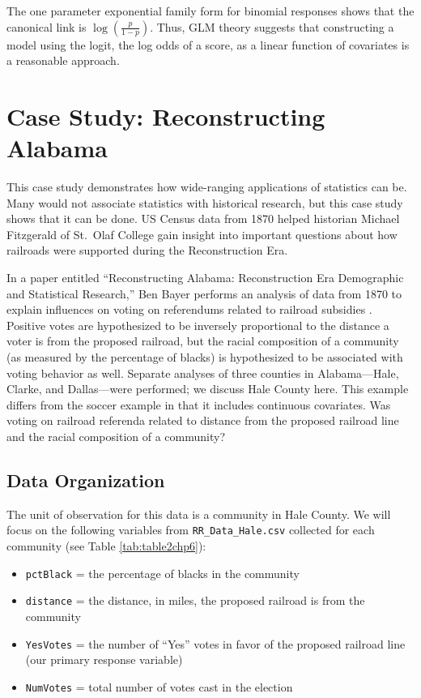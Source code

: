 \documentclass[
]{krantz}
\begin{document}
The one parameter exponential family form for binomial responses shows that the canonical link is \(\log\left(\frac{p}{1-p}\right)\). Thus, GLM theory suggests that constructing a model using the logit, the log odds of a score, as a linear function of covariates is a reasonable approach.

\hypertarget{case-study-reconstructing-alabama}{%
\section{Case Study: Reconstructing Alabama}\label{case-study-reconstructing-alabama}}

This case study demonstrates how wide-ranging applications of statistics can be. Many would not associate statistics with historical research, but this case study shows that it can be done. US Census data from 1870 helped historian Michael Fitzgerald of St.~Olaf College gain insight into important questions about how railroads were supported during the Reconstruction Era.

In a paper entitled ``Reconstructing Alabama: Reconstruction Era Demographic and Statistical Research,'' Ben Bayer performs an analysis of data from 1870 to explain influences on voting on referendums related to railroad subsidies \citep{Bayer2011}. Positive votes are hypothesized to be inversely proportional to the distance a voter is from the proposed railroad, but the racial composition of a community (as measured by the percentage of blacks) is hypothesized to be associated with voting behavior as well. Separate analyses of three counties in Alabama---Hale, Clarke, and Dallas---were performed; we discuss Hale County here. This example differs from the soccer example in that it includes continuous covariates. Was voting on railroad referenda related to distance from the proposed railroad line and the racial composition of a community?

\hypertarget{data-organization-3}{%
\subsection{Data Organization}\label{data-organization-3}}

The unit of observation for this data is a community in Hale County. We will focus on the following variables from \texttt{RR\_Data\_Hale.csv} collected for each community (see Table \ref{tab:table2chp6}):

\begin{itemize}
\item
  \texttt{pctBlack} = the percentage of blacks in the community
\item
  \texttt{distance} = the distance, in miles, the proposed railroad is from the community
\item
  \texttt{YesVotes} = the number of ``Yes'' votes in favor of the proposed railroad line (our primary response variable)
\item
  \texttt{NumVotes} = total number of votes cast in the election
\end{itemize}
\end{document}
